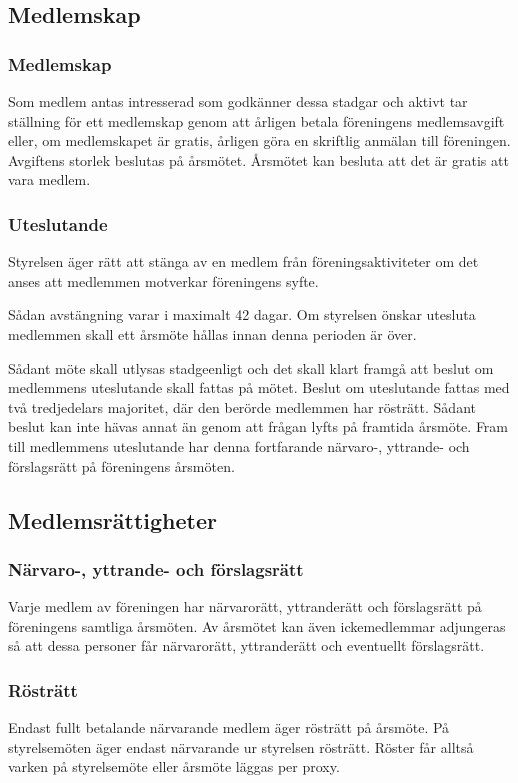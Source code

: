 \subsection{Medlemskap}

\subsubsection{Medlemskap}
Som medlem antas intresserad som godkänner dessa stadgar och aktivt tar ställning för ett medlemskap genom att årligen betala föreningens medlemsavgift eller, om medlemskapet är gratis, årligen göra en skriftlig anmälan till föreningen. Avgiftens storlek beslutas på årsmötet. Årsmötet kan besluta att det är gratis att vara medlem.

\subsubsection{Uteslutande}
Styrelsen äger rätt att stänga av en medlem från föreningsaktiviteter om det anses att medlemmen motverkar föreningens syfte.

Sådan avstängning varar i maximalt 42 dagar. Om styrelsen önskar utesluta medlemmen skall ett årsmöte hållas innan denna perioden är över.

Sådant möte skall utlysas stadgeenligt och det skall klart framgå att beslut om medlemmens uteslutande skall fattas på mötet. Beslut om uteslutande fattas med två tredjedelars majoritet, där den berörde medlemmen har rösträtt. Sådant beslut kan inte hävas annat än genom att frågan lyfts på framtida årsmöte. Fram till medlemmens uteslutande har denna fortfarande närvaro-, yttrande- och förslagsrätt på föreningens årsmöten.




\subsection{Medlemsrättigheter}

\subsubsection{Närvaro-, yttrande- och förslagsrätt}
Varje medlem av föreningen har närvarorätt, yttranderätt och förslagsrätt på föreningens samtliga årsmöten. Av årsmötet kan även ickemedlemmar adjungeras så att dessa personer får närvarorätt, yttranderätt och eventuellt förslagsrätt.

\subsubsection{Rösträtt}
Endast fullt betalande närvarande medlem äger rösträtt på årsmöte. På styrelsemöten äger endast närvarande ur styrelsen rösträtt. Röster får alltså varken på styrelsemöte eller årsmöte läggas per proxy.
